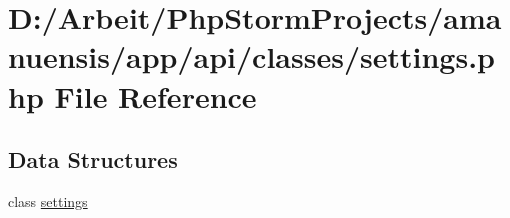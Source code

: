 \hypertarget{a00074}{}\section{D\+:/\+Arbeit/\+Php\+Storm\+Projects/amanuensis/app/api/classes/settings.php File Reference}
\label{a00074}
\subsection*{Data Structures}
\begin{DoxyCompactItemize}
\item 
class \hyperlink{a00044}{settings}
\end{DoxyCompactItemize}
